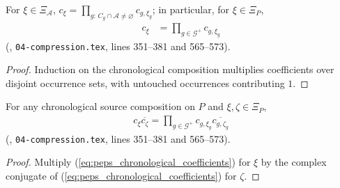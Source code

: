 \begin{lemma}
    \label{thm:peps_chronological_coefficients}
    \leanok
    For $\xi\in\Xi_{\mathcal A}$, $c_\xi=\prod_{g:\,C_g\cap\mathcal A\ne\varnothing} c_{g,\xi_g}$; in particular, for $\xi\in\Xi_P$,
    \begin{align}
        c_\xi & =\prod_{g\in\mathcal G^+}c_{g,\xi_g}
        \label{eq:peps_chronological_coefficients}
    \end{align}
    (\cite[proof of Theorem~5.2]{OpenAI2026PolynomialPEPS}, \texttt{04-compression.tex}, lines 351--381 and 565--573).
\end{lemma}
\begin{proof}
    \leanok
    Induction on the chronological composition multiplies coefficients over disjoint occurrence sets, with untouched occurrences contributing $1$.
\end{proof}

\begin{lemma}
    \label{thm:peps_mixed_chronological_coefficients}
    \leanok
    For any chronological source composition on $P$ and $\xi,\zeta\in\Xi_P$,
    \begin{align}
        c_\xi\overline{c_\zeta}
        =\prod_{g\in\mathcal G^+}
        c_{g,\xi_g}\overline{c_{g,\zeta_g}}
        \label{eq:peps_mixed_chronological_coefficients}
    \end{align}
    (\cite[proof of Theorem~5.2]{OpenAI2026PolynomialPEPS}, \texttt{04-compression.tex}, lines 351--381 and 565--573).
\end{lemma}
\begin{proof}\leanok
    Multiply (\ref{eq:peps_chronological_coefficients}) for $\xi$ by the complex conjugate of (\ref{eq:peps_chronological_coefficients}) for $\zeta$.
\end{proof}

